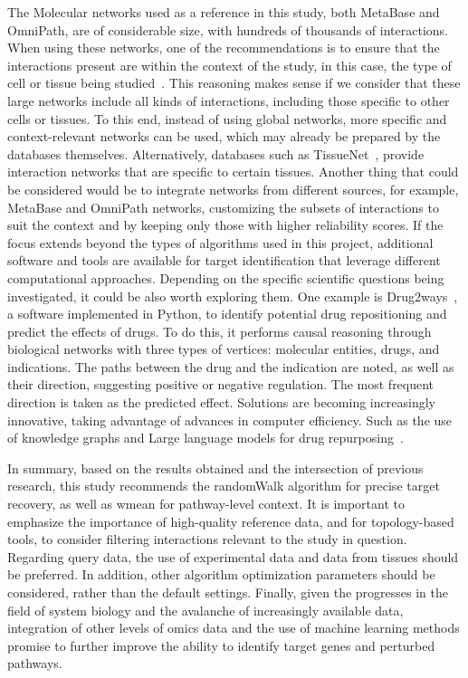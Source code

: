 The \gls{Molecular network}s used as a reference in this study, both MetaBase and OmniPath, are of considerable size, with hundreds of thousands of interactions. 
When using these networks, one of the recommendations is to ensure that the interactions present are within the context of the study, in this case, the type of cell or tissue being studied~\cite{RN38}. 
This reasoning makes sense if we consider that these large networks include all kinds of interactions, including those specific to other cells or tissues. 
To this end, instead of using global networks, more specific and context-relevant networks can be used, which may already be prepared by the databases themselves. 
Alternatively, databases such as TissueNet~\cite{RN137}, provide interaction networks that are specific to certain tissues. 
Another thing that could be considered would be to integrate networks from different sources, for example, MetaBase and OmniPath networks, customizing the subsets of interactions to suit the context and by keeping only those with higher reliability scores. 
If the focus extends beyond the types of algorithms used in this project, additional software and tools are available for target identification that leverage different computational approaches. 
Depending on the specific scientific questions being investigated, it could be also worth exploring them. One example is Drug2ways~\cite{RN132}, a software implemented in Python, to identify potential drug repositioning and predict the effects of drugs. 
To do this, it performs causal reasoning through biological networks with three types of vertices: molecular entities, drugs, and indications. 
The paths between the drug and the indication are noted, as well as their direction, suggesting positive or negative regulation. The most frequent direction is taken as the predicted effect. 
Solutions are becoming increasingly innovative, taking advantage of advances in computer efficiency. 
Such as the use of knowledge graphs and Large language models for drug repurposing~\cite{RN163}. 

In summary, based on the results obtained and the intersection of previous research, this study recommends the randomWalk algorithm for precise target recovery, as well as wmean for pathway-level context. 
It is important to emphasize the importance of high-quality reference data, and for topology-based tools, to consider filtering interactions relevant to the study in question. 
Regarding query data, the use of experimental data and data from tissues should be preferred. 
In addition, other algorithm optimization parameters should be considered, rather than the default settings. 
Finally, given the progresses in the field of system biology and the avalanche of increasingly available data, integration of other levels of omics data and the use of machine learning methods promise to further improve the ability to identify target genes and perturbed pathways.
